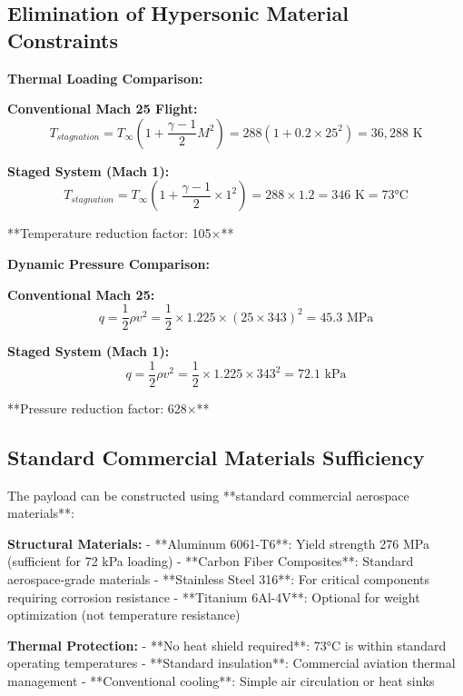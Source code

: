 \documentclass[12pt,a4paper]{article}
\begin{document}
\subsection{Elimination of Hypersonic Material Constraints}

\textbf{Thermal Loading Comparison:}

\textbf{Conventional Mach 25 Flight:}
\begin{equation}
T_{stagnation} = T_{\infty}\left(1 + \frac{\gamma-1}{2}M^2\right) = 288\left(1 + 0.2 \times 25^2\right) = 36,288 \text{ K}
\end{equation}

\textbf{Staged System (Mach 1):}
\begin{equation}
T_{stagnation} = T_{\infty}\left(1 + \frac{\gamma-1}{2} \times 1^2\right) = 288 \times 1.2 = 346 \text{ K} = 73°\text{C}
\end{equation}

**Temperature reduction factor: 105×**

\textbf{Dynamic Pressure Comparison:}

\textbf{Conventional Mach 25:}
\begin{equation}
q = \frac{1}{2}\rho v^2 = \frac{1}{2} \times 1.225 \times (25 \times 343)^2 = 45.3 \text{ MPa}
\end{equation}

\textbf{Staged System (Mach 1):}
\begin{equation}
q = \frac{1}{2}\rho v^2 = \frac{1}{2} \times 1.225 \times 343^2 = 72.1 \text{ kPa}
\end{equation}

**Pressure reduction factor: 628×**

\subsection{Standard Commercial Materials Sufficiency}

The payload can be constructed using **standard commercial aerospace materials**:

\textbf{Structural Materials:}
- **Aluminum 6061-T6**: Yield strength 276 MPa (sufficient for 72 kPa loading)
- **Carbon Fiber Composites**: Standard aerospace-grade materials
- **Stainless Steel 316**: For critical components requiring corrosion resistance
- **Titanium 6Al-4V**: Optional for weight optimization (not temperature resistance)

\textbf{Thermal Protection:}
- **No heat shield required**: 73°C is within standard operating temperatures
- **Standard insulation**: Commercial aviation thermal management
- **Conventional cooling**: Simple air circulation or heat sinks
\end{document}
